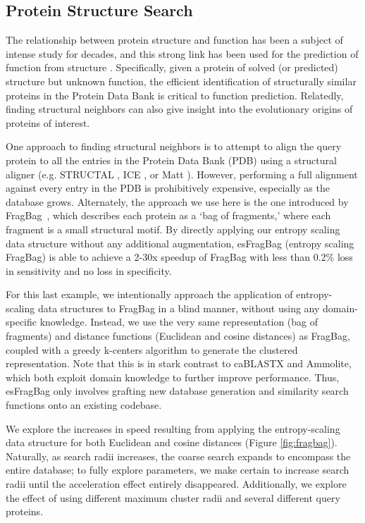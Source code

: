 \documentclass[review,preprint,12pt]{elsarticle}
\renewcommand{\cite}{\citep} %
\theoremstyle{definition}
\theoremstyle{remark}
\numberwithin{equation}{section}
\begin{document}
\subsection{Protein Structure Search}

The relationship between protein structure and function has been a subject of intense study for decades,
and this strong link has been used for the prediction of function from structure \cite{hegyi1999relationship}.
Specifically, given a protein of solved (or predicted) structure but unknown function, the efficient identification
of structurally similar proteins in the Protein Data Bank is critical to function prediction.
Relatedly, finding structural neighbors can also give insight into the evolutionary origins of proteins of interest.

One approach to finding structural neighbors is to attempt to align the query protein to all the entries in the Protein Data Bank (PDB) using a structural aligner (e.g. STRUCTAL \cite{subbiah1993structural}, ICE \cite{shindyalov1998protein}, or Matt \cite{menke2008matt}).
However, performing a full alignment against every entry in the PDB is prohibitively expensive, especially as the database grows.
Alternately, the approach we use here is the one introduced by FragBag~\cite{budowski2010fragbag}, which describes each protein as a
`bag of fragments,' where each fragment is a small structural motif.
By directly applying our entropy scaling data structure without any additional augmentation, esFragBag (entropy scaling FragBag) is able to achieve a 2-30x speedup of FragBag with less than 0.2\% loss in sensitivity and no loss in specificity.

For this last example, we intentionally approach the application of entropy-scaling data structures to FragBag in a blind manner,
without using any domain-specific knowledge.
Instead, we use the very same representation (bag of fragments) and distance functions (Euclidean and cosine distances)
as FragBag, coupled with a greedy k-centers algorithm to generate the clustered representation.
Note that this is in stark contrast to caBLASTX and Ammolite, which both exploit domain knowledge to further improve performance.
Thus, esFragBag only involves grafting new database generation and similarity search functions onto an existing codebase.

We explore the increases in speed resulting from applying the entropy-scaling data structure for both Euclidean and cosine distances (Figure \ref{fig:fragbag}).
Naturally, as search radii increases, the coarse search expands to encompass the entire database; to fully explore parameters, we make certain to increase search radii until the acceleration effect entirely disappeared.
Additionally, we explore the effect of using different maximum cluster radii and several different query proteins.
\end{document}
